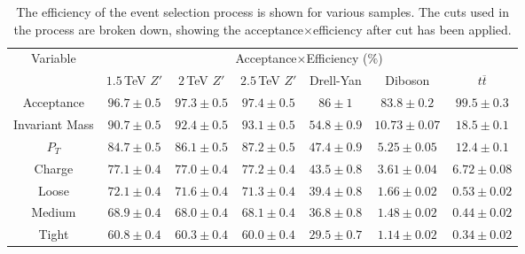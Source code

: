\documentclass{article}
\begin{document}
\begin{table}[h!t]
\caption{The efficiency of the event selection process is shown for various samples. The cuts used in the process are broken down, showing the acceptance$\times$efficiency after cut has been applied. \label{table:selectionEfficiency}}
\begin{tabular}{|c|c|c|c|c|c|c| } 
\hline
\multirow{2}{*}{Variable}  & \multicolumn{6}{|c|}{Acceptance$\times$Efficiency ($\%$)}\\\cline{2-7}
& $1.5\,$TeV $Z'$ & $2\,$TeV $Z'$ & $2.5\,$TeV $Z'$ & Drell-Yan & Diboson & $t\overline{t}$ \\\hline
Acceptance & $96.7\pm0.5$ & $97.3\pm0.5$ & $97.4\pm0.5$ & $86\pm1$ & $83.8\pm0.2$ & $99.5\pm0.3$ \\\hline
Invariant Mass & $90.7\pm0.5$ & $92.4\pm0.5$ & $93.1\pm0.5$ & $54.8\pm0.9$ & $10.73\pm0.07$ & $18.5\pm0.1$ \\\hline
$P_T$ & $84.7\pm0.5$ & $86.1\pm0.5$ & $87.2\pm0.5$ & $47.4\pm0.9$ & $5.25\pm0.05$ & $12.4\pm0.1$ \\\hline
Charge & $77.1\pm0.4$ & $77.0\pm0.4$ & $77.2\pm0.4$ & $43.5\pm0.8$ & $3.61\pm0.04$ & $6.72\pm0.08$ \\\hline
Loose & $72.1\pm0.4$ & $71.6\pm0.4$ & $71.3\pm0.4$ & $39.4\pm0.8$ & $1.66\pm0.02$ & $0.53\pm0.02$ \\\hline
Medium & $68.9\pm0.4$ & $68.0\pm0.4$ & $68.1\pm0.4$ & $36.8\pm0.8$ & $1.48\pm0.02$ & $0.44\pm0.02$\\\hline
Tight & $60.8\pm0.4$ & $60.3\pm0.4$ & $60.0\pm0.4$ & $29.5\pm0.7$ & $1.14\pm0.02$ & $0.34\pm0.02$\\\hline
\end{tabular}
\end{table}
\end{document}
